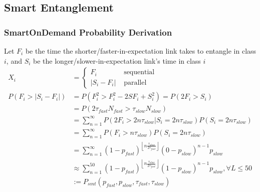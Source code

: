 \subsection{Smart Entanglement}
\subsubsection{SmartOnDemand Probability Derivation}
Let $F_i$ be the time the shorter/faster-in-expectation link takes to entangle in class $i$, and $S_i$ be the longer/slower-in-expectation link's time in class $i$
\begingroup
\allowdisplaybreaks
\begin{align*}
    X_i                           & = \left\{\begin{array}{lr}
                                                 F_i                  & \mbox{ sequential} \\
                                                 \left|S_i-F_i\right| & \mbox{ parallel}
                                             \end{array}\right.                                                                                              \\
    P(F_i > \left|S_i-F_i\right|) & = P(F_i^2 > F_i^2-2SF_i+S_i^2)= P(2F_i > S_i)                                                                                                   \\
                                  & = P(2\tau_{fast}N_{fast} > \tau_{slow}N_{slow})                                                                                                 \\
                                  & = \sum_{n=1}^{\infty}P(2F_i>2n\tau_{slow}|S_i=2n\tau_{slow})P(S_i=2n\tau_{slow})                                                                \\
                                  & = \sum_{n=1}^{\infty}P(F_i>n\tau_{slow})P(S_i=2n\tau_{slow})                                                                                    \\
                                  & = \sum_{n=1}^{\infty}(1-p_{fast})^{\left\lfloor{n\frac{\tau_{slow}}{2\tau_{fast}}}\right\rfloor}(0-p_{slow})^{n-1}p_{slow}                      \\
                                  & \approx \sum_{n=1}^{50}(1-p_{fast})^{\left\lfloor{n\frac{\tau_{slow}}{2\tau_{fast}}}\right\rfloor}(1-p_{slow})^{n-1}p_{slow}, \forall L \leq 50 \\
                                  & := P_{smt}(p_{fast}, p_{slow}, \tau_{fast}, \tau_{slow})                                                                                        \\
\end{align*}
\endgroup

